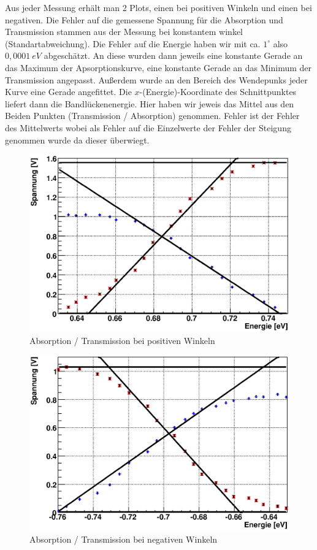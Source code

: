 \documentclass[12pt]{article}
\begin{document}
Aus jeder Messung erhält man 2 Plots, einen bei positiven Winkeln und einen bei negativen. Die Fehler auf die gemessene Spannung für die Absorption und Transmission stammen aus der Messung bei konstantem winkel (Standartabweichung). Die Fehler auf die Energie haben wir mit ca. $1^\circ$ also $0,0001~eV$ abgeschätzt. An diese wurden dann jeweils eine konstante Gerade an das Maximum der Apsorptionskurve, eine konstante Gerade an das Minimum der Transmission angepasst. Außerdem wurde an den Bereich des Wendepunks jeder Kurve eine Gerade angefittet. Die $x$-(Energie)-Koordinate des Schnittpunktes liefert dann die Bandlückenenergie. Hier haben wir jeweis das Mittel aus den Beiden Punkten (Transmission / Absorption) genommen. Fehler ist der Fehler des Mittelwerts wobei als Fehler auf die Einzelwerte der Fehler der Steigung genommen wurde da dieser überwiegt. \\
\begin{figure}[H]  
\centering
\includegraphics[width=0.9\linewidth]{pictures/bandluecke/grge1.eps}
\caption{Absorption / Transmission bei positiven Winkeln}
\end{figure}

\begin{figure}[H]  
\centering
\includegraphics[width=0.9\linewidth]{pictures/bandluecke/grge1b.eps}
\caption{Absorption / Transmission bei negativen Winkeln}
\end{figure}
\end{document}
